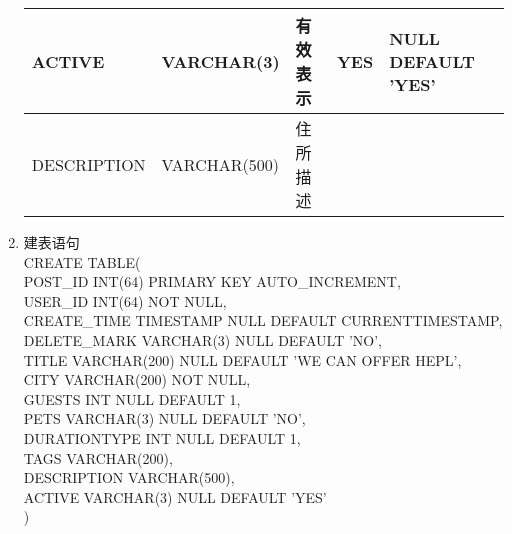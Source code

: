\begin{enumerate}
\begin{table}[htbp]
{\begin{tabular}{|l|l|l|l|l|}
        ACTIVE       & VARCHAR(3)   & 有效表示      & YES               & NULL DEFAULT 'YES'               \\ \hline
        DESCRIPTION  & VARCHAR(500) & 住所描述
        \end{tabular}
        }
        \end{table}
    \item 建表语句\\
        CREATE TABLE(\\
            POST\_ID INT(64) PRIMARY KEY AUTO\_INCREMENT,\\
            USER\_ID INT(64) NOT NULL, \\
            CREATE\_TIME TIMESTAMP NULL DEFAULT CURRENTTIMESTAMP,\\
            DELETE\_MARK VARCHAR(3) NULL DEFAULT 'NO',\\
            TITLE VARCHAR(200) NULL DEFAULT 'WE CAN OFFER HEPL',\\
            CITY VARCHAR(200) NOT NULL,\\
            GUESTS INT NULL DEFAULT 1,\\
            PETS VARCHAR(3) NULL DEFAULT 'NO',\\
            DURATIONTYPE INT NULL DEFAULT 1,\\
            TAGS VARCHAR(200),\\
            DESCRIPTION VARCHAR(500),\\
            ACTIVE VARCHAR(3) NULL DEFAULT 'YES'\\
        )
    \end{enumerate}

